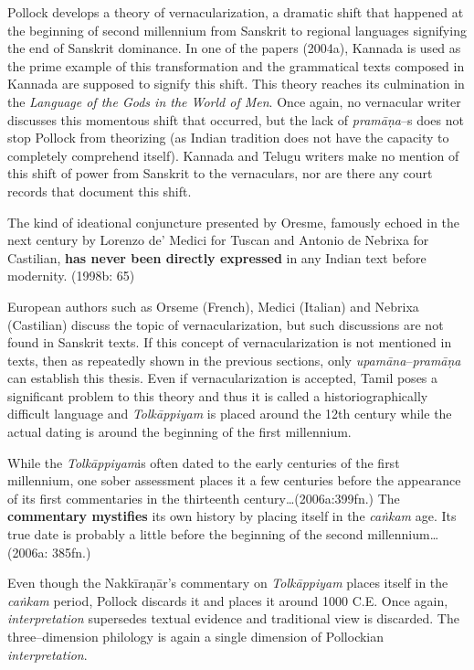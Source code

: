 Pollock develops a theory of vernacularization, a dramatic shift that happened at the beginning of second millennium from Sanskrit to regional languages signifying the end of Sanskrit dominance. In one of the papers (2004a), Kannada is used as the prime example of this transformation and the grammatical texts composed in Kannada are supposed to signify this shift. This theory reaches its culmination in the \textit{Language of the Gods in the World of Men}. Once again, no vernacular writer discusses this momentous shift that occurred, but the lack of \textit{pramāṇa}–s does not stop Pollock from theorizing (as Indian tradition does not have the capacity to completely comprehend itself). Kannada and Telugu writers make no mention of this shift of power from Sanskrit to the vernaculars, nor are there any court records that document this shift.

\begin{myquote}
The kind of ideational conjuncture presented by Oresme, famously echoed in the next century by Lorenzo de’ Medici for Tuscan and Antonio de Nebrixa for Castilian, \textbf{has never been directly expressed} in any Indian text before modernity. (1998b: 65)
\end{myquote}

European authors such as Orseme (French), Medici (Italian) and Nebrixa (Castilian) discuss the topic of vernacularization, but such discussions are not found in Sanskrit texts. If this concept of vernacularization is not mentioned in texts, then as repeatedly shown in the previous sections, only \textit{upamāna}–\textit{pramāṇa} can establish this thesis. Even if vernacularization is accepted, Tamil poses a significant problem to this theory and thus it is called a historiographically difficult language and \textit{Tolkāppiyam} is placed around the 12th century while the actual dating is around the beginning of the first millennium.

\begin{myquote}
While the \textit{Tolkāppiyam}is often dated to the early centuries of the first millennium, one sober assessment places it a few centuries before the appearance of its first commentaries in the thirteenth century…(2006a:399fn.) The \textbf{commentary mystifies} its own history by placing itself in the \textit{caṅkam} age. Its true date is probably a little before the beginning of the second millennium…(2006a: 385fn.)
\end{myquote}

Even though the Nakkīraṇār’s commentary on \textit{Tolkāppiyam }places itself in the \textit{caṅkam} period, Pollock discards it and places it around 1000 C.E. Once again, \textit{interpretation} supersedes textual evidence and traditional view is discarded. The three–dimension philology is again a single dimension of Pollockian \textit{interpretation}.


